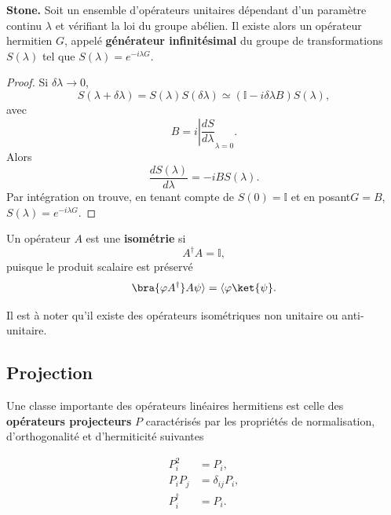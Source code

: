 \medskip
\colorbox[gray]{0.8}{
\parbox[c]{0.9\textwidth}{
\begin{theorem}
\label{Th:stone} \textbf{Stone.} Soit un ensemble d'opérateurs unitaires
dépendant d'un paramètre continu $\lambda$ et vérifiant la loi du groupe
abélien. Il existe alors un opérateur hermitien $G$, appelé \textbf{générateur
infinitésimal} du groupe de transformations $S(\lambda)$ tel que $S(\lambda)
=e^{-i\lambda G}$.
\end{theorem}
}}
\medskip

\begin{proof}
Si $\delta\lambda\rightarrow0$,
\begin{equation}
S(\lambda+\delta\lambda)=S(\lambda)S(\delta\lambda)\simeq(\mathbb{I}
-i\delta\lambda B)S(\lambda),
\end{equation}
avec%
\begin{equation}
B=i\left\vert \frac{dS}{d\lambda}\right.  _{\lambda=0}.
\end{equation}
Alors%
\begin{equation}
\frac{dS(\lambda)}{d\lambda}=-iBS(\lambda).
\end{equation}
Par intégration on trouve, en tenant compte de $S(0)=\mathbb{I}$ et en
posant$G=B$, $S(\lambda)=e^{-i\lambda G}$.
\end{proof}

Un opérateur $A$ est une \textbf{isométrie} si
\begin{equation}
A^{\dag}A=\mathbb{I},
\end{equation}
puisque le produit scalaire est préservé%
\begin{equation}
\bra{\varphi A^{\dag}} A\psi\rangle= \langle\varphi\ket{\psi}.
\end{equation}

Il est à noter qu'il existe des opérateurs isométriques non unitaire ou
anti-unitaire.

\subsection{Projection}

Une classe importante des opérateurs linéaires hermitiens est celle des
\textbf{opérateurs projecteurs} $P$ caractérisés par les propriétés de
normalisation, d'orthogonalité et d'hermiticité suivantes

\medskip
\colorbox[gray]{0.8}{
\parbox[c]{0.9\textwidth}{
\begin{subequations}
\begin{align}
P_{i}^{2} & = P_{i},\\
P_{i}P_{j}  &  =\delta_{ij}P_{i},\\
P_{i}^{\dagger}  &  =P_{i}.
\end{align}
\end{subequations}
}}\medskip

